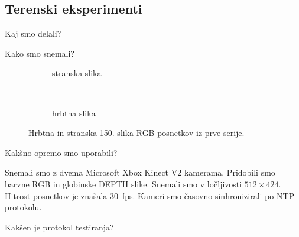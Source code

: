 \subsection{Terenski eksperimenti}

Kaj smo delali?

Kako smo snemali?

\begin{figure}[htb]
	\centering
	\begin{subfigure}{0.45\columnwidth}
		\caption{stranska slika}
	\end{subfigure}
	~
	\begin{subfigure}{0.45\columnwidth}
		\caption{hrbtna slika}
	\end{subfigure}
	\caption{Hrbtna in stranska 150. slika RGB posnetkov iz prve serije.}
	\label{fig:primer-posnetka-teren}
\end{figure}

Kakšno opremo smo uporabili?

Snemali smo z dvema Microsoft Xbox Kinect V2 kamerama. Pridobili smo barvne RGB in globinske DEPTH slike. Snemali smo v ločljivosti $512 \times 424$. Hitrost posnetkov je znašala \SI{30}{fps}. Kameri smo časovno sinhronizirali po NTP protokolu.

Kakšen je protokol testiranja?

